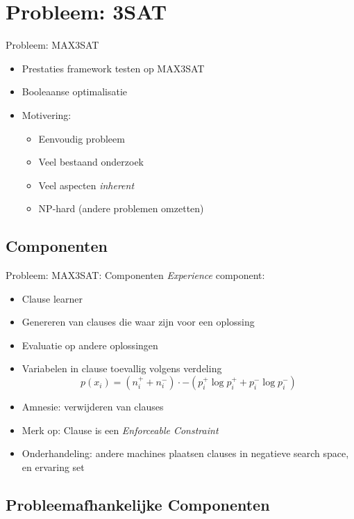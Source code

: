 \documentclass[handout]{beamer}
\begin{document}
\section{Probleem: 3SAT}
\begin{frame}{Probleem: MAX3SAT}
\begin{itemize}[<+->]
 \item Prestaties framework testen op MAX3SAT
 \item Booleaanse optimalisatie
 \item Motivering:
 \begin{itemize}[<+->]
  \item Eenvoudig probleem
  \item Veel bestaand onderzoek
  \item Veel aspecten \emph{inherent}
  \item NP-hard (andere problemen omzetten)
 \end{itemize}
\end{itemize}
\end{frame}
\subsection{Componenten}
\begin{frame}{Probleem: MAX3SAT: Componenten}
\emph{Experience} component:
\begin{itemize}[<+->]
 \item Clause learner
 \item Genereren van clauses die waar zijn voor een oplossing
 \item Evaluatie op andere oplossingen
 \item Variabelen in clause toevallig volgens verdeling
 \begin{equation}
  p(x_i)=(n_i^++n_i^-)\cdot -(p_i^+\log p_i^++p_i^-\log p_i^-)
 \end{equation}
 \item Amnesie: verwijderen van clauses
 \item Merk op: Clause is een \emph{Enforceable Constraint}
 \item Onderhandeling: andere machines plaatsen clauses in negatieve search space, en ervaring set
\end{itemize}
\end{frame}
\subsection{Probleemafhankelijke Componenten}
\end{document}
